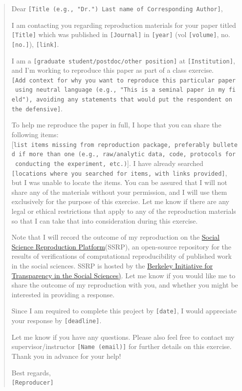\documentclass[]{book}
\begin{document}
\begin{quote}
Dear \texttt{{[}Title\ (e.g.,\ "Dr.")\ Last\ name\ of\ Corresponding\ Author{]}},

I am contacting you regarding reproduction materials for your paper titled \texttt{{[}Title{]}} which was published in \texttt{{[}Journal{]}} in \texttt{{[}year{]}} (vol \texttt{{[}volume{]}}, no. \texttt{{[}no.{]}}), \texttt{{[}link{]}}.

I am a \texttt{{[}graduate\ student/postdoc/other\ position{]}} at \texttt{{[}Institution{]}}, and I'm working to reproduce this paper as part of a class exercise. \texttt{{[}Add\ context\ for\ why\ you\ want\ to\ reproduce\ this\ particular\ paper\ using\ neutral\ language\ (e.g.,\ "This\ is\ a\ seminal\ paper\ in\ my\ field"),\ avoiding\ any\ statements\ that\ would\ put\ the\ respondent\ on\ the\ defensive{]}}.

To help me reproduce the paper in full, I hope that you can share the following items: {[}\texttt{list\ items\ missing\ from\ reproduction\ package,\ preferably\ bulleted\ if\ more\ than\ one\ (e.g.,\ raw/analytic\ data,\ code,\ protocols\ for\ conducting\ the\ experiment,\ etc.)}{]}. I have already searched \texttt{{[}locations\ where\ you\ searched\ for\ items,\ with\ links\ provided{]}}, but I was unable to locate the items. You can be assured that I will not share any of the materials without your permission, and I will use them exclusively for the purpose of this exercise. Let me know if there are any legal or ethical restrictions that apply to any of the reproduction materials so that I can take that into consideration during this exercise.

Note that I will record the outcome of my reproduction on the \href{https://www.socialsciencereproduction.org/}{Social Science Reproduction Platform}(SSRP), an open-source repository for the results of verifications of computational reproducibility of published work in the social sciences. SSRP is hosted by the \href{https://www.bitss.org/}{Berkeley Initiative for Transparency in the Social Sciences)}. Let me know if you would like me to share the outcome of my reproduction with you, and whether you might be interested in providing a response.

Since I am required to complete this project by \texttt{{[}date{]}}, I would appreciate your response by \texttt{{[}deadline{]}}.

Let me know if you have any questions. Please also feel free to contact my supervisor/instructor \texttt{{[}Name\ (email){]}} for further details on this exercise. Thank you in advance for your help!

Best regards,\\
\texttt{{[}Reproducer{]}}
\end{quote}
\end{document}
